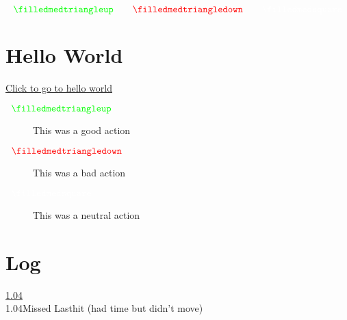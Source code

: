 \documentclass{article}
\begin{document}
\pagecolor{WisdotaBackground}
\color{white}
\blinddocument


$$\color{green} \filledmedtriangleup\quad\quad \color{red} \filledmedtriangledown \quad \quad \color{white} \filledmedsquare $$


\section{Hello World}
\label{sec:hello}

\hyperref[sec:hello]{Click to go to hello world}

\newcommand{\gt}{\ensuremath{\;\;\color{green} \filledmedtriangleup} }
\newcommand{\rt}{\ensuremath{\;\;\color{red} \filledmedtriangledown} }
\newcommand{\ws}{\ensuremath{\;\;\color{white} \filledmedsquare} }

\begin{description}
\item[\gt] This was a good action 
\item[\rt] This was a bad action 
\item[\ws] This was a neutral action
\end{description}


\section{Log}

\newcommand{\mhl}[3]{\hyperlink{#1}{#1}\\ \hypertarget{#1}{#1\;#2 \;#3}}

\mhl{1.04}{Missed Lasthit}{(had time but didn't move)}
\end{document}
